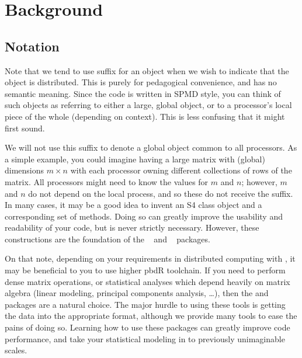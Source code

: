 \chapter{Background}
\label{sec:bg}

% 

\section[Notation]{Notation}
\label{sec:notation}

Note that we tend to use suffix  for an object when we wish to indicate that the object is distributed.  This is purely for pedagogical convenience, and has no semantic meaning.  Since the code is written in SPMD style, you can think of such objects as referring to either a large, global object, or to a processor's local piece of the whole (depending on context).  This is less confusing that it might first sound.

We will not use this suffix to denote a global object common to all processors.  As a simple example, you could imagine having a large matrix with (global) dimensions $m\times n$ with each processor owning different collections of rows of the matrix.  All processors might need to know the values for $m$ and $n$; however, $m$ and $n$ do not depend on the local process, and so these do not receive the  suffix.  In many cases, it may be a good idea to invent an S4 class object and a corresponding set of methods.  Doing so can greatly improve the usability and readability of your code, but is never strictly necessary.  However, these constructions are the foundation of the ~\citep{Schmidt2012pbdBASEpackage} and
~\citep{Schmidt2012pbdDMATpackage} packages.

On that note, depending on your requirements in distributed computing with , it may be beneficial to you to use higher pbdR toolchain.  If you need to perform dense matrix operations, or statistical analyses which depend heavily on matrix algebra (linear modeling, principal components analysis, \dots), then the  and  packages are a natural choice.  The major hurdle to using these tools is getting the data into the appropriate  format, although we provide many tools to ease the pains of doing so.  Learning how to use these packages can greatly improve code performance, and take your statistical modeling in  to previously unimaginable scales.

